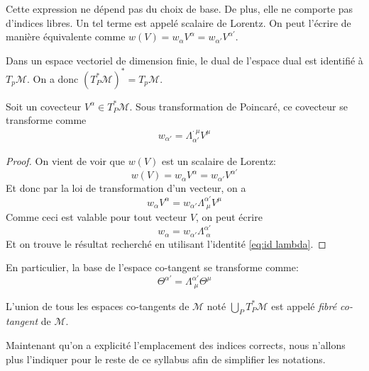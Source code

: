 Cette expression ne dépend pas du choix de base. De plus, elle ne comporte pas d'indices libres. Un tel terme est appelé scalaire de Lorentz. On peut l'écrire de manière équivalente comme $w(V) = w_{\alpha} V^{\alpha} = w_{\alpha '} V^{\alpha '} $.
\begin{rmk}
    Dans un espace vectoriel de dimension finie, le dual de l'espace dual est identifié à $T_p\mathcal{M}$. On a donc $(T^*_P\mathcal{M})^* = T_p\mathcal{M}$.
\end{rmk} 
\begin{theoremframe}
    \begin{propri}
        Soit un covecteur $V^\alpha\in T^*_P\mathcal{M}$. Sous transformation de Poincaré, ce covecteur se transforme comme
    \begin{align}
        w_{\alpha'} = \Lambda^{\cdot \, \mu}_{\alpha'} V^\mu
    \end{align}
    \end{propri}
\end{theoremframe}
\begin{proof}
    On vient de voir que $w(V)$ est un scalaire de Lorentz:
    \begin{equation}
        w(V) = w_{\alpha} V^{\alpha} = w_{\alpha '} V^{\alpha '} 
    \end{equation}
    Et donc par la loi de transformation d'un vecteur, on a
    \begin{equation}
        w_{\alpha} V^{\alpha} = w_{\alpha '} \Lambda^{\alpha '}_{\;\mu} V^\mu
    \end{equation}
    Comme ceci est valable pour tout vecteur $V$, on peut écrire
    \begin{equation}
        w_{\alpha}  = w_{\alpha '} \Lambda^{\alpha '}_{\;\alpha}
    \end{equation}
    Et on trouve le résultat recherché en utilisant l'identité \ref{eq:id lambda}.
\end{proof}

En particulier, la base de l'espace co-tangent se transforme comme:
$$ \Theta^{\alpha '} = \Lambda^{\alpha '}_{\; \mu} \Theta^{\mu}$$

\begin{theoremframe}
    \begin{defi}
        L'union de tous les espaces co-tangents de $\mathcal{M}$ noté $\bigcup_P T^*_P\mathcal{M}$ est appelé \textit{fibré co-tangent} de $\mathcal{M}$.
    \end{defi}
\end{theoremframe}
Maintenant qu'on a explicité l'emplacement des indices corrects, nous n'allons plus l'indiquer pour le reste de ce syllabus afin de simplifier les notations.

